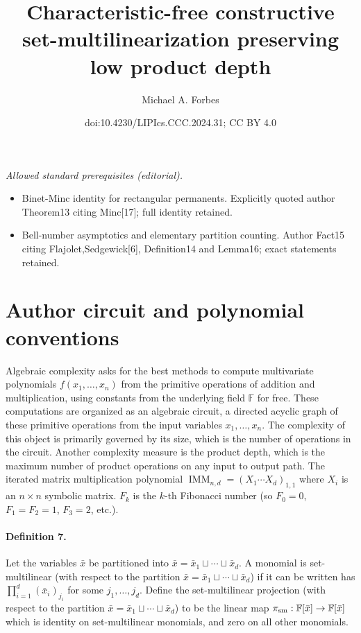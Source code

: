\documentclass[10pt,a4paper]{article}
\title{Characteristic-free constructive set-multilinearization preserving low product depth}
\author{Michael A. Forbes}
\date{doi:10.4230/LIPIcs.CCC.2024.31; CC BY 4.0}
\begin{document}
\maketitle
\noindent\textit{Allowed standard prerequisites (editorial).}\begin{itemize}
\item Binet-Minc identity for rectangular permanents. Explicitly quoted author Theorem13 citing Minc[17]; full identity retained.
\item Bell-number asymptotics and elementary partition counting. Author Fact15 citing Flajolet,Sedgewick[6], Definition14 and Lemma16; exact statements retained.
\end{itemize}\medskip
\section*{Author circuit and polynomial conventions}
Algebraic complexity asks for the best methods to compute multivariate polynomials $f(x_1,\ldots,x_n)$ from the primitive operations of addition and multiplication, using constants from the underlying field $\mathbb F$ for free. These computations are organized as an algebraic circuit, a directed acyclic graph of these primitive operations from the input variables $x_1,\ldots,x_n$. The complexity of this object is primarily governed by its size, which is the number of operations in the circuit. Another complexity measure is the product depth, which is the maximum number of product operations on any input to output path.
The iterated matrix multiplication polynomial $\operatorname{IMM}_{n,d}=(X_1\cdots X_d)_{1,1}$ where $X_i$ is an $n\times n$ symbolic matrix. $F_k$ is the $k$-th Fibonacci number (so $F_0=0$, $F_1=F_2=1$, $F_3=2$, etc.).

\paragraph{Definition 7.} Let the variables $\bar x$ be partitioned into $\bar x=\bar x_1\sqcup\cdots\sqcup\bar x_d$. A monomial is set-multilinear (with respect to the partition $\bar x=\bar x_1\sqcup\cdots\sqcup\bar x_d$) if it can be written has $\prod_{i=1}^d(\bar x_i)_{j_i}$ for some $j_1,\ldots,j_d$.
Define the set-multilinear projection (with respect to the partition $\bar x=\bar x_1\sqcup\cdots\sqcup\bar x_d$) to be the linear map $\pi_{\rm sm}:\mathbb F[\bar x]\to\mathbb F[\bar x]$ which is identity on set-multilinear monomials, and zero on all other monomials.
\end{document}
